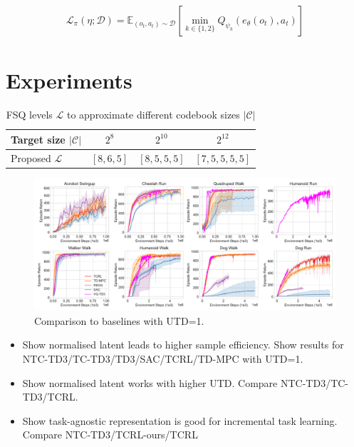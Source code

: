 \documentclass{article}
\theoremstyle{plain}
\theoremstyle{definition}
\theoremstyle{remark}
\newcommand{\E}{\mathbb{E}}
\begin{document}
\begin{align} \label{eq:policy-loss}
 \mathcal{L}_{\pi}(\eta; \mathcal{D}) = \E_{(o_{t}, a_{t}) \sim \mathcal{D}} \left[ \min_{k\in\{1,2\}} Q_{\psi_{k}}(e_{\theta}(o_{t}), a_{t}) \right]
\end{align}

\section{Experiments}
\label{sec:experiments}

\begin{table}[t]
\caption{FSQ levels $\mathcal{L}$ to approximate different codebook sizes $|\mathcal{C}|$}
\label{sample-table}
\vskip 0.15in
\begin{center}
\begin{small}
\begin{sc}
\begin{tabular}{lccc}
\toprule
Target size $|\mathcal{C}|$ & $2^{8}$ & $2^{10}$ & $2^{12}$ \\
\midrule
Proposed $\mathcal{L}$ & $[8,6,5]$ & $[8,5,5,5]$ & $[7,5,5,5,5]$ \\
\end{tabular}
\end{sc}
\end{small}
\end{center}
\vskip -0.1in
\end{table}


\begin{figure}[ht]
\vskip 0.2in
\begin{center}
\centerline{\includegraphics[width=1.0\textwidth]{./figs/main_plot.pdf}}
\caption{Comparison to baselines with UTD=1.}
\label{fig:main_plot}
\end{center}
\vskip -0.2in
\end{figure}


\begin{itemize}
    \item Show normalised latent leads to higher sample efficiency. Show results for NTC-TD3/TC-TD3/TD3/SAC/TCRL/TD-MPC with UTD=1.
    \item Show normalised latent works with higher UTD. Compare NTC-TD3/TC-TD3/TCRL.
    \item Show task-agnostic representation is good for incremental task learning. Compare NTC-TD3/TCRL-ours/TCRL
\end{itemize}
\end{document}
